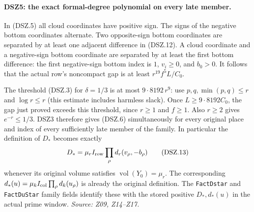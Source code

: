 \paragraph{DSZ5: the exact formal-degree polynomial on every late member.}
\label{claim:DSZ5}
In (DSZ.5) all cloud coordinates have positive sign. The signs of
the negative bottom coordinates alternate. Two opposite-sign bottom
coordinates are separated by at least one adjacent difference in
(DSZ.12). A cloud coordinate and a negative-sign bottom coordinate
are separated by at least the first bottom difference: the first
negative-sign bottom index is $1$, $v_i\ge0$, and $b_0>0$.
It follows that the actual row's noncompact gap is at least
$r^{19}f^5L/C_0$.

The threshold (DSZ.3) for $\delta=1/3$ is at most
$9\cdot8192\,r^9$: use $p,q,\min(p,q)\le r$ and
$\log r\le r$ (this estimate includes harmless slack).
Once $L\ge9\cdot8192 C_0$, the gap just proved exceeds this
threshold, since $r\ge1$ and $f\ge1$.
Also $r\ge2$ gives $e^{-r}\le1/3$.
DSZ3 therefore gives (DSZ.6) simultaneously for every original
place and index of every sufficiently late member of the family.
In particular the definition of $D_*$ becomes exactly
\[
 D_* =\mu_r I_{\rm row}\prod_\rho d_r(v_\rho,-b_\rho)
                                                               \tag{DSZ.13}
\]
whenever its original volume satisfies $\operatorname{vol}(Y_0)=\mu_r$.
The corresponding $d_*(u)=\mu_k I_{\rm col}\prod_\rho d_k(u_\rho)$
is already the original definition. The \texttt{FactDstar} and
\texttt{FactDuStar} family fields identify these with the stored
positive $D_*,d_*(u)$ in the actual prime window.
\emph{Source: Z09, Z14--Z17.}


